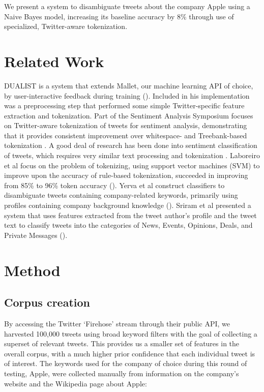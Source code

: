 \documentclass[letterpaper]{article}
\begin{document}
We present a system to disambiguate tweets about the company Apple using a Naive Bayes model, increasing its baseline accuracy by 8\% through use of specialized, Twitter-aware tokenization.

\section{Related Work}
DUALIST is a system that extends Mallet, our machine learning API of choice, by user-interactive feedback during training (\citeauthor{Settles:2011:CLF:2145432.2145588}). Included in his implementation was a preprocessing step that performed some simple Twitter-specific feature extraction and tokenization. Part of the Sentiment Analysis Symposium focuses on Twitter-aware tokenization of tweets for sentiment analysis, demonstrating that it provides consistent improvement over whitespace- and Treebank-based tokenization \cite{potts2011}. A good deal of research has been done into sentiment classification of tweets, which requires very similar text processing and tokenization \cite{Pak10}. Laboreiro et al focus on the problem of tokenizing, using support vector machines (SVM) to improve upon the accuracy of rule-based tokenization, succeeded in improving from 85\% to 96\% token accuracy (\citeauthor{Laboreiro:2010:TMM:1871840.1871853}). Yerva et al construct classifiers to disambiguate tweets containing company-related keywords, primarily using profiles containing company background knowledge (\citeauthor{journals/ijcsa/YervaMA12}). Sriram et al presented a system that uses features extracted from the tweet author's profile and the tweet text to classify tweets into the categories of News, Events, Opinions, Deals, and Private Messages (\citeauthor{Sriram:2010:STC:1835449.1835643}).

\section{Method}
\subsection{Corpus creation}
By accessing the Twitter `Firehose' stream through their public API, we harvested 100,000 tweets using broad keyword filters with the goal of collecting a superset of relevant tweets. This provides us a smaller set of features in the overall corpus, with a much higher prior confidence that each individual tweet is of interest. The keywords used for the company of choice during this round of testing, Apple, were collected manually from information on the company's website and the Wikipedia page about Apple:\\
\end{document}
